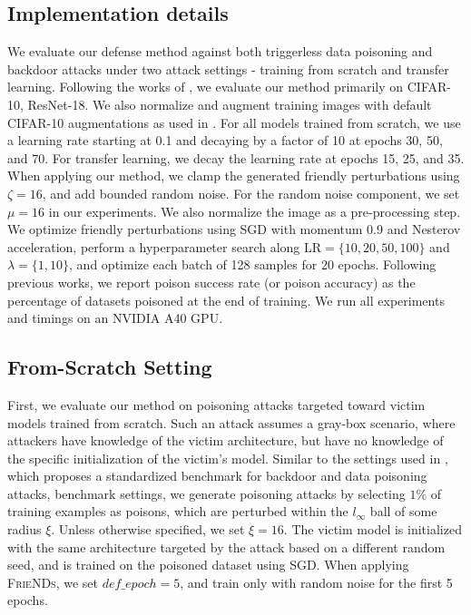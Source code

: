 \documentclass{article}
\newcommand{\alg}{\textsc{FrieNDs}}
\begin{document}
\subsection{Implementation details}

We evaluate our defense method against both triggerless data poisoning and backdoor attacks under two attack settings - training from scratch and transfer learning. 
Following the works of \citep{geiping2020witches,geiping2021doesn,schwarzschild2020just}, we evaluate our method primarily on CIFAR-10, ResNet-18. We also normalize and augment training images with default CIFAR-10 augmentations as used in \cite{geiping2021doesn}. 
For all models trained from scratch, we use a learning rate starting at 0.1 and decaying by a factor of 10 at epochs 30, 50, and 70. For transfer learning, we decay the learning rate at epochs 15, 25, and 35.
When applying our method, we clamp the generated friendly perturbations using $\zeta=16$, and add bounded random noise. For the random noise component, we set $\mu=16$ in our experiments. We also normalize the image as a pre-processing step. We optimize friendly perturbations using SGD with momentum 0.9 and Nesterov acceleration,  perform a hyperparameter search along LR$=\{10,20,50,100\}$ and $\lambda=\{1,10\}$, and optimize each batch of 128 samples for 20 epochs. Following previous works, we report poison success rate (or poison accuracy) as the percentage of datasets poisoned at the end of training. We run all experiments and timings on an NVIDIA A40 GPU.

\subsection{From-Scratch Setting}
First, we evaluate our method on poisoning attacks targeted toward victim models trained from scratch. Such an attack assumes a gray-box scenario, where attackers have knowledge of the victim architecture, but have no knowledge of the specific initialization of the victim's model. Similar to the settings used in \cite{schwarzschild2020just}, which proposes a standardized benchmark for backdoor and data poisoning attacks, benchmark settings, we generate poisoning attacks by selecting $1\%$ of training examples as poisons, which are perturbed within the $l_\infty$ ball of some radius $\xi$. Unless otherwise specified, we set $\xi=16$. The victim model is initialized with the same architecture targeted by the attack based on a different random seed, and is trained on the poisoned dataset using SGD. When applying \alg{}, we set $def\_epoch=5$, and train only with random noise for the first 5 epochs.
\end{document}
